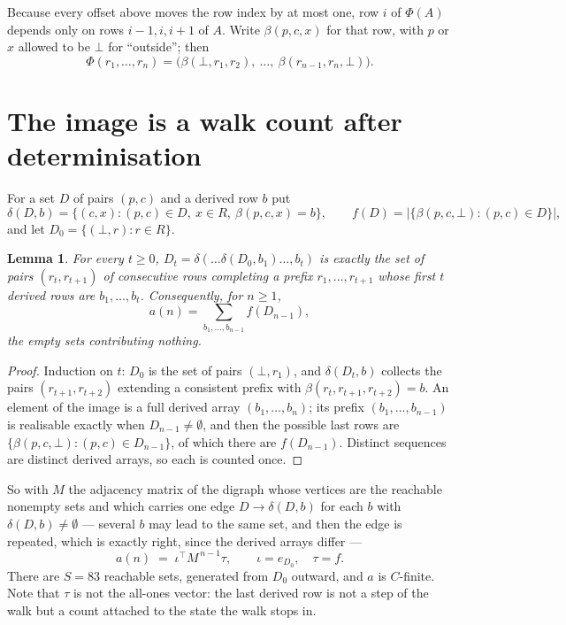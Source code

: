\documentclass[11pt,a4paper]{article}
\theoremstyle{plain}
\newtheorem{lemma}[theorem]{Lemma}
\theoremstyle{definition}
\begin{document}
Because every offset above moves the row index by at most one, row $i$ of
$\Phi(A)$ depends only on rows $i-1,i,i+1$ of $A$. Write $\beta(p,c,x)$ for that row, with $p$
or $x$ allowed to be $\bot$ for ``outside''; then
\[
\Phi(r_1,\dots,r_n)=\bigl(\beta(\bot,r_1,r_2),\ \dots,\ \beta(r_{n-1},r_n,\bot)\bigr).
\]

\section{The image is a walk count after determinisation}

For a set $D$ of pairs $(p,c)$ and a derived row $b$ put
\[
\delta(D,b)=\{(c,x):(p,c)\in D,\ x\in R,\ \beta(p,c,x)=b\},\qquad
f(D)=\bigl|\{\beta(p,c,\bot):(p,c)\in D\}\bigr| ,
\]
and let $D_0=\{(\bot,r):r\in R\}$.

\begin{lemma}\label{lem:det}
For every $t\ge0$, $D_t=\delta(\dots\delta(D_0,b_1)\dots,b_t)$ is exactly the set of pairs
$(r_t,r_{t+1})$ of consecutive rows completing a prefix $r_1,\dots,r_{t+1}$ whose first $t$
derived rows are $b_1,\dots,b_t$. Consequently, for $n\ge1$,
\[
a(n)=\sum_{b_1,\dots,b_{n-1}}f(D_{n-1}),
\]
the empty sets contributing nothing.
\end{lemma}

\begin{proof}
Induction on $t$: $D_0$ is the set of pairs $(\bot,r_1)$, and $\delta(D_t,b)$ collects the
pairs $(r_{t+1},r_{t+2})$ extending a consistent prefix with
$\beta(r_t,r_{t+1},r_{t+2})=b$. An element of the image is a full derived array
$(b_1,\dots,b_n)$; its prefix $(b_1,\dots,b_{n-1})$ is realisable exactly when
$D_{n-1}\neq\emptyset$, and then the possible last rows are
$\{\beta(p,c,\bot):(p,c)\in D_{n-1}\}$, of which there are $f(D_{n-1})$. Distinct sequences
are distinct derived arrays, so each is counted once.
\end{proof}

So with $M$ the adjacency matrix of the digraph whose vertices are the reachable nonempty sets
and which carries one edge $D\to\delta(D,b)$ for each $b$ with $\delta(D,b)\neq\emptyset$ ---
several $b$ may lead to the same set, and then the edge is repeated, which is exactly right,
since the derived arrays differ ---
\[
a(n)\;=\;\iota^{\!\top}M^{\,n-1}\tau,\qquad \iota=e_{D_0},\quad \tau=f .
\]
There are $S=83$ reachable sets, generated from $D_0$ outward, and $a$ is $C$-finite.
Note that $\tau$ is not the all-ones vector: the last derived row is not a
step of the walk but a count attached to the state the walk stops in.
\end{document}
